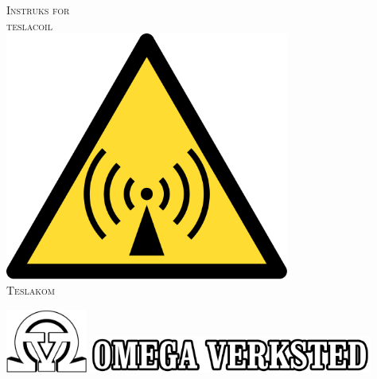 \begin{titlepage}
\thispagestyle{empty}
\selectfont
\centering
\textsc{\Huge Instruks for} \\[1cm]
\textsc{\Huge teslacoil} \\[3cm]

\includegraphics[width=0.7\textwidth]{img/NonIonisingRadiationWarning} \\[3cm]


\textsc{\Huge Teslakom} \\ [1cm]
\begin{flushbottom}
\vfill
\includegraphics[width=0.2\textwidth]{img/omegav_inverted_u_text} \includegraphics[width=0.7\textwidth]{img/omegav_inverted_text}
\end{flushbottom}

\end{titlepage}